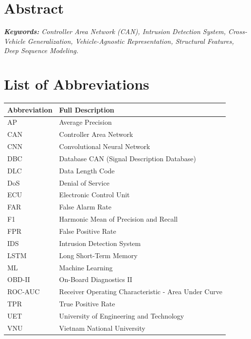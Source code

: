 \documentclass[12pt, a4paper, reqno, oneside]{book}
\begin{document}
\chapter*{Abstract}
\vspace{20pt}

\vspace{1em}
\noindent \textit{\textbf{Keywords:} Controller Area Network (CAN), Intrusion Detection System, Cross-Vehicle Generalization, Vehicle-Agnostic Representation, Structural Features, Deep Sequence Modeling.}

\newpage

\hypersetup{pageanchor=true}
\tableofcontents
\newpage

\listoffigures
\newpage

\listoftables
\newpage

\begingroup
\listofalgorithms
\let\clearpage\relax
\endgroup
\newpage

\chapter*{List of Abbreviations}
\vspace{20pt}
\begin{table}[H]
\centering
\begin{tabular}{|m{3cm}|m{11cm}|}
\hline
\textbf{Abbreviation} & \textbf{Full Description} \\ \hline
AP & Average Precision \\ \hline
CAN & Controller Area Network \\ \hline
CNN & Convolutional Neural Network \\ \hline
DBC & Database CAN (Signal Description Database) \\ \hline
DLC & Data Length Code \\ \hline
DoS & Denial of Service \\ \hline
ECU & Electronic Control Unit \\ \hline
FAR & False Alarm Rate \\ \hline
F1 & Harmonic Mean of Precision and Recall \\ \hline
FPR & False Positive Rate \\ \hline
IDS & Intrusion Detection System \\ \hline
LSTM & Long Short-Term Memory \\ \hline
ML & Machine Learning \\ \hline
OBD-II & On-Board Diagnostics II \\ \hline
ROC-AUC & Receiver Operating Characteristic - Area Under Curve \\ \hline
TPR & True Positive Rate \\ \hline
UET & University of Engineering and Technology \\ \hline
VNU & Vietnam National University \\ \hline
\end{tabular}
\end{table}
\end{document}
